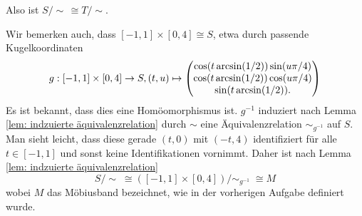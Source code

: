 \documentclass[a4paper,10pt]{article}
\begin{document}
Also ist $S/\!\sim\, \cong T/\!\sim$.

Wir bemerken auch, dass $[-1,1] \times [0,4] \cong S$, etwa durch passende Kugelkoordinaten
\[
 g : [-1,1] \times [0,4] \to S, (t,u) \mapsto
 \begin{pmatrix}
  \cos(t \arcsin(1/2)) \sin(u \pi/4) \\
  \cos(t \arcsin(1/2)) \cos(u \pi/4) \\
  \sin(t \arcsin(1/2)).
 \end{pmatrix}
\]
Es ist bekannt, dass dies eine Homöomorphismus ist. $g^{-1}$ induziert nach Lemma \ref{lem: indzuierte äquivalenzrelation} durch $\sim$ eine Äquivalenzrelation $\sim_{g^{-1}}$ auf $S$. Man sieht leicht, dass diese gerade $(t,0)$ mit $(-t,4)$ identifiziert für alle $t \in [-1,1]$ und sonst keine Identifikationen vornimmt. Daher ist nach Lemma \ref{lem: indzuierte äquivalenzrelation}
\[
 S/\!\sim\; \cong ([-1,1] \times [0,4])/\!\sim_{g^{-1}}\; \cong M
\]
wobei $M$ das Möbiusband bezeichnet, wie in der vorherigen Aufgabe definiert wurde.
\end{document}
